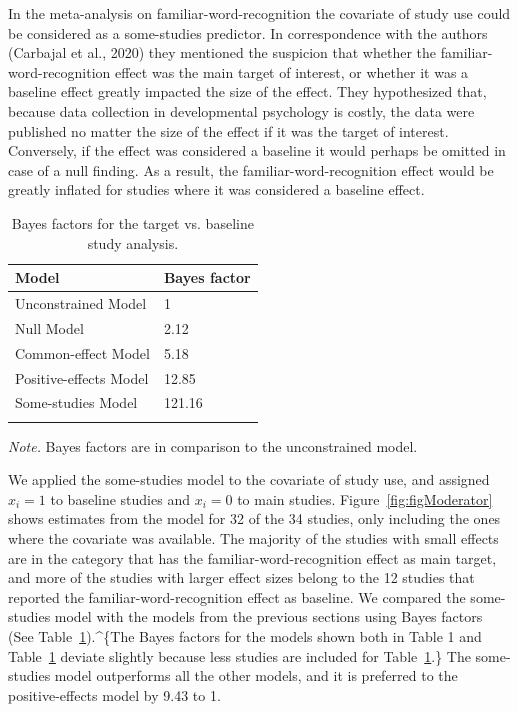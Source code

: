 \documentclass[english,,man]{apa6}
\begin{document}
In the meta-analysis on familiar-word-recognition the covariate of study use could be considered as a some-studies predictor. In correspondence with the authors (Carbajal et al., 2020) they mentioned the suspicion that whether the familiar-word-recognition effect was the main target of interest, or whether it was a baseline effect greatly impacted the size of the effect. They hypothesized that, because data collection in developmental psychology is costly, the data were published no matter the size of the effect if it was the target of interest. Conversely, if the effect was considered a baseline it would perhaps be omitted in case of a null finding. As a result, the familiar-word-recognition effect would be greatly inflated for studies where it was considered a baseline effect.

\begin{table}[tbp]

\begin{center}
\begin{threeparttable}

\caption{\label{tab:ss-tab}Bayes factors for the target vs. baseline study analysis.}

\begin{tabular}{ll}
\toprule
Model & \multicolumn{1}{c}{Bayes factor}\\
\midrule
Unconstrained Model & 1\\
Null Model & 2.12\\
Common-effect Model & 5.18\\
Positive-effects Model & 12.85\\
Some-studies Model & 121.16\\
\bottomrule
\addlinespace
\end{tabular}

\begin{tablenotes}[para]
\normalsize{\textit{Note.} Bayes factors are in comparison to the unconstrained model.}
\end{tablenotes}

\end{threeparttable}
\end{center}

\end{table}

We applied the some-studies model to the covariate of study use, and assigned \(x_i = 1\) to baseline studies and \(x_i = 0\) to main studies. Figure~\ref{fig:figModerator} shows estimates from the model for 32 of the 34 studies, only including the ones where the covariate was available. The majority of the studies with small effects are in the category that has the familiar-word-recognition effect as main target, and more of the studies with larger effect sizes belong to the 12 studies that reported the familiar-word-recognition effect as baseline. We compared the some-studies model with the models from the previous sections using Bayes factors (See Table~\ref{tab:ss-tab}).\^{}\{The Bayes factors for the models shown both in Table 1 and Table~\ref{tab:ss-tab} deviate slightly because less studies are included for Table~\ref{tab:ss-tab}.\} The some-studies model outperforms all the other models, and it is preferred to the positive-effects model by 9.43 to 1.
\end{document}
